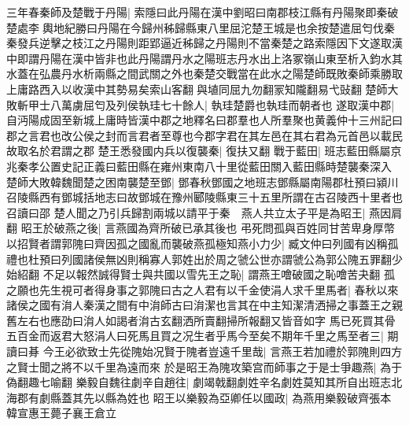 三年春秦師及楚戰于丹陽|{
	索隱曰此丹陽在漢中劉昭曰南郡枝江縣有丹陽聚即秦破楚處李輿地紀勝曰丹陽在今歸州秭歸縣東八里屈沱楚王城是也余按楚遣屈匄伐秦秦發兵逆擊之枝江之丹陽則距郢逼近秭歸之丹陽則不當秦楚之路索隱因下文遂取漢中即謂丹陽在漢中皆非也此丹陽謂丹水之陽班志丹水出上洛冢嶺山東至析入鈞水其水蓋在弘農丹水析兩縣之間武關之外也秦楚交戰當在此水之陽楚師既敗秦師乘勝取上庸路西入以收漢中其勢易矣索山客翻與埴同屈九勿翻冡知隴翻易弋䜴翻}
楚師大敗斬甲士八萬虜屈匄及列侯執珪七十餘人|{
	執珪楚爵也執珪而朝者也}
遂取漢中郡|{
	自沔陽成固至新城上庸時皆漢中郡之地釋名曰郡羣也人所羣聚也黄義仲十三州記曰郡之言君也改公侯之封而言君者至尊也今郡字君在其左邑在其右君為元首邑以載民故取名於君謂之郡}
楚王悉發國内兵以復襲秦|{
	復扶又翻}
戰于藍田|{
	班志藍田縣屬京兆秦孝公置史記正義曰藍田縣在雍州東南八十里從藍田關入藍田縣時楚襲秦深入}
楚師大敗韓魏聞楚之困南襲楚至鄧|{
	鄧春秋鄧國之地班志鄧縣屬南陽郡杜預曰潁川召陵縣西有鄧城括地志曰故鄧城在豫州郾陵縣東三十五里所謂在古召陵西十里者也召讀曰邵}
楚人聞之乃引兵歸割兩城以請平于秦　燕人共立太子平是為昭王|{
	燕因肩翻}
昭王於破燕之後|{
	言燕國為齊所破已承其後也}
弔死問孤與百姓同甘苦卑身厚幣以招賢者謂郭隗曰齊因孤之國亂而襲破燕孤極知燕小力少|{
	臧文仲曰列國有凶稱孤禮也杜預曰列國諸侯無凶則稱寡人郭姓出於周之虢公世亦謂虢公為郭公隗五罪翻少始紹翻}
不足以報然誠得賢士與共國以雪先王之恥|{
	謂燕王噲破國之恥噲苦夬翻}
孤之願也先生視可者得身事之郭隗曰古之人君有以千金使涓人求千里馬者|{
	春秋以來諸侯之國有㳙人秦漢之間有中㳙師古曰㳙潔也言其在中主知潔清洒掃之事蓋王之親舊左右也應劭曰㳙人如謁者㳙古玄翻洒所賣翻掃所報翻又皆音如字}
馬已死買其骨五百金而返君大怒涓人曰死馬且買之况生者乎馬今至矣不期年千里之馬至者三|{
	期讀曰朞}
今王必欲致士先從隗始况賢于隗者豈遠千里哉|{
	言燕王若加禮於郭隗則四方之賢士聞之將不以千里為遠而來}
於是昭王為隗攻築宫而師事之于是士爭趣燕|{
	為于偽翻趣七喻翻}
樂毅自魏往劇辛自趙往|{
	劇竭戟翻劇姓辛名劇姓莫知其所自出班志北海郡有劇縣蓋其先以縣為姓也}
眧王以樂毅為亞卿任以國政|{
	為燕用樂毅破齊張本}
韓宣惠王薨子襄王倉立

